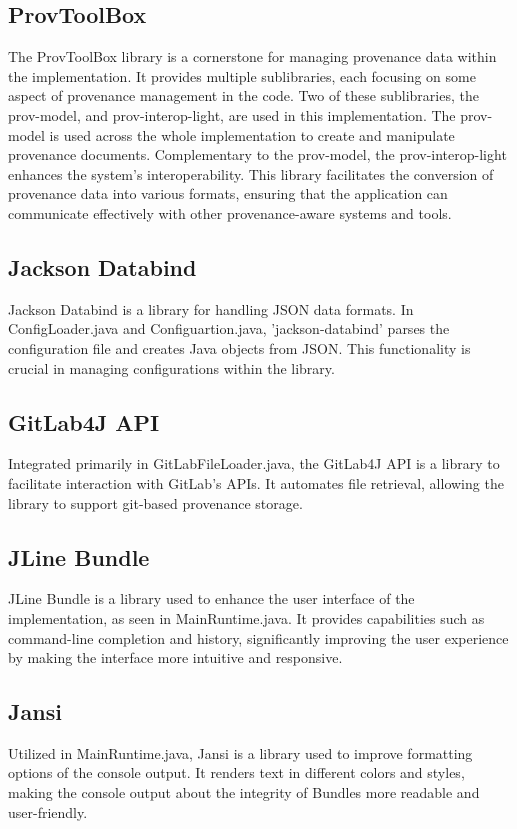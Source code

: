 \documentclass[
  digital,     %
  oneside,     %
  nosansbold,  %
  nocolorbold, %
  lof,         %
  lot,         %
]{fithesis4}
\begin{document}
\subsection{ProvToolBox}
The ProvToolBox library \cite{provtoolbox} is a cornerstone for managing provenance data within the implementation. It provides multiple sublibraries, each focusing on some aspect of provenance management in the code. Two of these sublibraries, the prov-model, and prov-interop-light, are used in this implementation. The prov-model is used across the whole implementation to create and manipulate provenance documents. Complementary to the prov-model, the prov-interop-light enhances the system's interoperability. This library facilitates the conversion of provenance data into various formats, ensuring that the application can communicate effectively with other provenance-aware systems and tools.
\subsection{Jackson Databind}
Jackson Databind \cite{jackson} is a library for handling JSON data formats. In ConfigLoader.java and Configuartion.java, 'jackson-databind' parses the configuration file and creates Java objects from JSON. This functionality is crucial in managing configurations within the library.
\subsection{GitLab4J API}
Integrated primarily in GitLabFileLoader.java, the GitLab4J API \cite{gitapi} is a library to facilitate interaction with GitLab's APIs. It automates file retrieval, allowing the library to support git-based provenance storage.
\subsection{JLine Bundle}
JLine Bundle \cite{jline} is a library used to enhance the user interface of the implementation, as seen in MainRuntime.java. It provides capabilities such as command-line completion and history, significantly improving the user experience by making the interface more intuitive and responsive.
\subsection{Jansi}
Utilized in MainRuntime.java, Jansi \cite{jansi} is a library used to improve formatting options of the console output. It renders text in different colors and styles, making the console output about the integrity of Bundles more readable and user-friendly.
\end{document}
